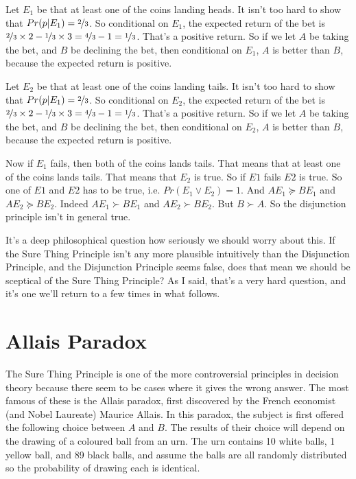 Let $E_1$ be that at least one of the coins landing heads. It isn't too hard to show that $Pr(p | E_1) = \nicefrac{2}{3}$. So conditional on $E_1$, the expected return of the bet is $\nicefrac{2}{3} \times 2 - \nicefrac{1}{3} \times 3 = \nicefrac{4}{3} - 1 = \nicefrac{1}{3}$. That's a positive return. So if we let $A$ be taking the bet, and $B$ be declining the bet, then conditional on $E_1$, $A$ is better than $B$, because the expected return is positive.

Let $E_2$ be that at least one of the coins landing tails. It isn't too hard to show that $Pr(p | E_1) = \nicefrac{2}{3}$. So conditional on $E_2$, the expected return of the bet is $\nicefrac{2}{3} \times 2 - \nicefrac{1}{3} \times 3 = \nicefrac{4}{3} - 1 = \nicefrac{1}{3}$. That's a positive return. So if we let $A$ be taking the bet, and $B$ be declining the bet, then conditional on $E_2$, $A$ is better than $B$, because the expected return is positive.

Now if $E_1$ fails, then both of the coins lands tails. That means that at least one of the coins lands tails. That means that $E_2$ is true. So if $E1$ fails $E2$ is true. So one of $E1$ and $E2$ has to be true, i.e. $Pr(E_1 \vee E_2) = 1$. And $AE_1 \succeq BE_1$ and $AE_2 \succeq BE_2$. Indeed $AE_1 \succ BE_1$ and $AE_2 \succ BE_2$. But $B \succ A$. So the disjunction principle isn't in general true.

It's a deep philosophical question how seriously we should worry about this. If the Sure Thing Principle isn't any more plausible intuitively than the Disjunction Principle, and the Disjunction Principle seems false, does that mean we should be sceptical of the Sure Thing Principle? As I said, that's a very hard question, and it's one we'll return to a few times in what follows.

\section{Allais Paradox}
The Sure Thing Principle is one of the more controversial principles in decision theory because there seem to be cases where it gives the wrong answer. The most famous of these is the Allais paradox, first discovered by the French economist (and Nobel Laureate) Maurice Allais. In this paradox, the subject is first offered the following choice between $A$ and $B$. The results of their choice will depend on the drawing of a coloured ball from an urn. The urn contains 10 white balls, 1 yellow ball, and 89 black balls, and assume the balls are all randomly distributed so the probability of drawing each is identical.

